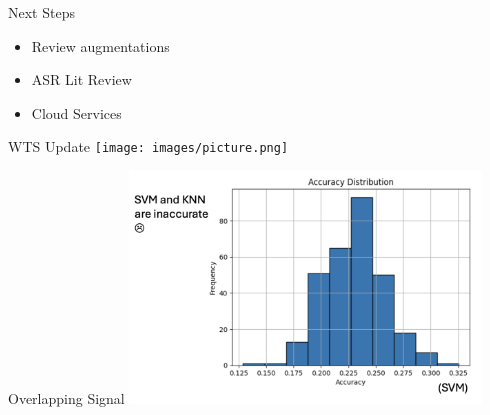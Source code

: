 \begin{frame}{Next Steps}
    \centering
    \begin{itemize}
        \item Review augmentations
        \item ASR Lit Review
        \item Cloud Services
    \end{itemize}
\end{frame}

\begin{frame}{WTS Update}
    \centering
    \texttt{[image: images/picture.png]}
\end{frame}

\begin{frame}{Overlapping Signal}
    \centering
    \includegraphics[height=0.7\textheight,width=0.7\textwidth,keepaspectratio]{images/dylan-3-6.png}
\end{frame}




